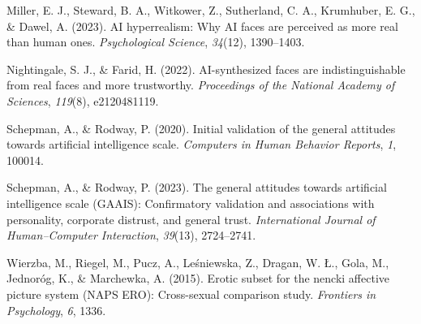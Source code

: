 \documentclass[
  jou,
  floatsintext,
  longtable,
  nolmodern,
  notxfonts,
  notimes,
  colorlinks=true,linkcolor=blue,citecolor=blue,urlcolor=blue]{apa7}
\newlength{\cslhangindent}
\newenvironment{CSLReferences}[2] %
 {\begin{list}{}{%
  \setlength{\itemindent}{0pt}
  \setlength{\leftmargin}{0pt}
  \setlength{\parsep}{0pt}
  \ifodd #1
   \setlength{\leftmargin}{\cslhangindent}
   \setlength{\itemindent}{-1\cslhangindent}
  \fi
  \setlength{\itemsep}{#2\baselineskip}}}
 {\end{list}}
\begin{document}
\begin{CSLReferences}{1}{0}
Miller, E. J., Steward, B. A., Witkower, Z., Sutherland, C. A.,
Krumhuber, E. G., \& Dawel, A. (2023). AI hyperrealism: Why AI faces are
perceived as more real than human ones. \emph{Psychological Science},
\emph{34}(12), 1390--1403.

Nightingale, S. J., \& Farid, H. (2022). AI-synthesized faces are
indistinguishable from real faces and more trustworthy.
\emph{Proceedings of the National Academy of Sciences}, \emph{119}(8),
e2120481119.

Schepman, A., \& Rodway, P. (2020). Initial validation of the general
attitudes towards artificial intelligence scale. \emph{Computers in
Human Behavior Reports}, \emph{1}, 100014.

Schepman, A., \& Rodway, P. (2023). The general attitudes towards
artificial intelligence scale (GAAIS): Confirmatory validation and
associations with personality, corporate distrust, and general trust.
\emph{International Journal of Human--Computer Interaction},
\emph{39}(13), 2724--2741.

Wierzba, M., Riegel, M., Pucz, A., Leśniewska, Z., Dragan, W. Ł., Gola,
M., Jednoróg, K., \& Marchewka, A. (2015). Erotic subset for the nencki
affective picture system (NAPS ERO): Cross-sexual comparison study.
\emph{Frontiers in Psychology}, \emph{6}, 1336.

\end{CSLReferences}
\end{document}
